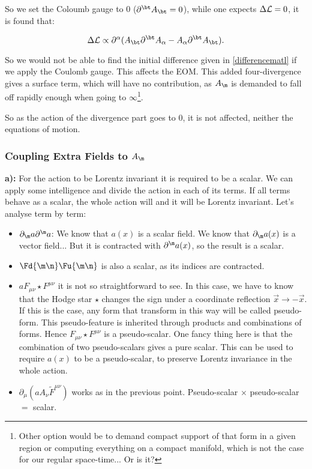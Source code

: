 So we set the Coloumb gauge to 0 ($\pu{\bt}\vad{\bt}=0$), while one expects $\Delta\mathcal{L} = 0$, it is found that:

\begin{equation}
	\Delta \matL \propto \pu{\alpha}(\vad{\bt}\pu{\bt}\vad{\alpha} - \vad{\alpha} \pu{\bt}\vad{\bt}).
\end{equation}

So we would not be able to find the initial difference given in \ref{differencematl} if we apply the Coulomb gauge. This affects the EOM. This added four-divergence gives a surface term, which will have no contribution, as $\vad{\m}$ is demanded to fall off rapidly enough when going to $\infty$\footnote{Other option would be to demand compact support of that form in a given region or computing everything on a compact manifold, which is not the case for our regular space-time... Or is it?}.

So as the action of the divergence part goes to 0, it is not affected, neither the equations of motion.

\subsubsection{Coupling Extra Fields to $\vad{\m}$}\label{Coupling Extra Fields to amu}

\textbf{a):}
For the action to be Lorentz invariant it is required to be a scalar. We can apply some intelligence and divide the action in each of its terms. If all terms behave as a scalar, the whole action will and it will be Lorentz invariant. Let's analyse term by term:

\begin{itemize}
	\item $\pd{\m} a \pu{\m} a$:  We know that $a(x)$ is a scalar field. We know that $\pd{\m}a(x)$ is a vector field... But it is contracted with $\pu{\m}a(x)$, so the result is a scalar.
	
	\item $\Fd{\m\n}\Fu{\m\n}$ is also a scalar, as its indices are contracted.
	
	\item $a F_{\mu \nu} \star F^{ \mu \nu}$ it is not so straightforward to see. In this case, we have to know that the Hodge star $\star$ changes the sign under a coordinate reflection $\vec{x}\rightarrow -\vec{x}$. If this is the case, any form that transform in this way will be called pseudo-form. This pseudo-feature is inherited through products and combinations of forms. Hence $F_{\mu \nu} \star F^{ \mu \nu}$ is a pseudo-scalar. One fancy thing here is that the combination of two pseudo-scalars gives a pure scalar. This can be used to require $a(x)$ to be a pseudo-scalar, to preserve Lorentz invariance in the whole action.
	
	\item $\partial_{\mu}\left(a A_{\nu} \tilde{F}^{\mu \nu}\right)$ works as in the previous point. Pseudo-scalar $\times$ pseudo-scalar $=$ scalar.
\end{itemize}


